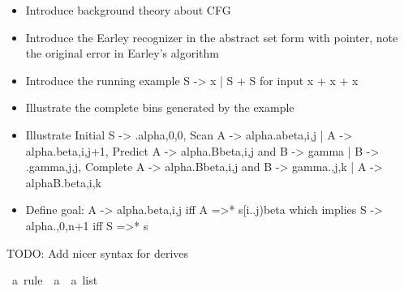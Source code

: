%
\begin{isabellebody}%
%
%
\isadelimtheory
%
\endisadelimtheory
%
\isatagtheory
%
\endisatagtheory
{\isafoldtheory}%
%
\isadelimtheory
%
\endisadelimtheory
%
\isadelimdocument
%
\endisadelimdocument
%
\isatagdocument
%
\isamarkuptrue%
%
\isamarkuptrue%
%
\endisatagdocument
{\isafolddocument}%
%
\isadelimdocument
%
\endisadelimdocument
%
\begin{isamarkuptext}%
\begin{itemize}
    \item Introduce background theory about CFG
    \item Introduce the Earley recognizer in the abstract set form with pointer, note the original error in Earley's algorithm \\
    \item Introduce the running example S -> x | S + S for input x + x + x \\
    \item Illustrate the complete bins generated by the example \\
    \item Illustrate Initial S -> .alpha,0,0, Scan A -> alpha.abeta,i,j | A -> alpha.beta,i,j+1,
      Predict A -> alpha.Bbeta,i,j and B -> gamma | B -> .gamma,j,j,
      Complete A -> alpha.Bbeta,i,j and B -> gamma.,j,k | A -> alphaB.beta,i,k \\
    \item Define goal: A -> alpha.beta,i,j iff A =>* s[i..j)beta which implies S -> alpha.,0,n+1 iff S =>* s \\
  \end{itemize}%
\end{isamarkuptext}\isamarkuptrue%
%
\begin{isamarkuptext}%
TODO: Add nicer syntax for derives%
\end{isamarkuptext}\isamarkuptrue%
%
\isadelimdocument
%
\endisadelimdocument
%
\isatagdocument
%
\isamarkuptrue%
%
\endisatagdocument
{\isafolddocument}%
%
\isadelimdocument
%
\endisadelimdocument
{}\isamarkupfalse%
\ {\isacharprime}{\kern0pt}a\ rule\ {\isacharequal}{\kern0pt}\ {\isachardoublequoteopen}{\isacharprime}{\kern0pt}a\ {\isasymtimes}\ {\isacharprime}{\kern0pt}a\ list{\isachardoublequoteclose}\isanewline
{}\isamarkupfalse%

\end{isabellebody}

